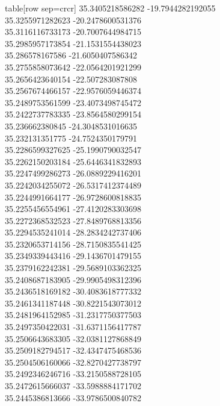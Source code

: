   table[row sep=crcr]{%
35.3405218586282	-19.7944282192055\\
35.3255971282623	-20.2478600531376\\
35.3116116733173	-20.7007644984715\\
35.2985957173854	-21.1531554438023\\
35.286578167586	-21.6050407586342\\
35.2755858073642	-22.0564201921299\\
35.2656423640154	-22.507283087808\\
35.2567674466157	-22.9576059446374\\
35.2489753561599	-23.4073498745472\\
35.2422737783335	-23.8564580299154\\
35.236662380845	-24.3048531016635\\
35.232131351775	-24.7524350179791\\
35.2286599327625	-25.1990790032547\\
35.2262150203184	-25.6446341832893\\
35.2247499286273	-26.0889229416201\\
35.2242034255072	-26.5317412374489\\
35.2244991664177	-26.9728600818835\\
35.2255456554961	-27.4120283303698\\
35.2272368532523	-27.8489768813356\\
35.2294535241014	-28.2834242737406\\
35.2320653714156	-28.7150835541425\\
35.2349339443416	-29.1436701479155\\
35.2379162242381	-29.5689103362325\\
35.2408687183905	-29.9905498312396\\
35.2436518169182	-30.4083618777332\\
35.2461341187448	-30.8221543073012\\
35.2481964152985	-31.2317750377503\\
35.2497350422031	-31.6371156417787\\
35.2506643683305	-32.0381127868849\\
35.2509182794517	-32.4347475468536\\
35.2504506160066	-32.8270427738797\\
35.2492346246716	-33.2150588728105\\
35.2472615666037	-33.5988884171702\\
35.2445386813666	-33.9786500840782\\
}
